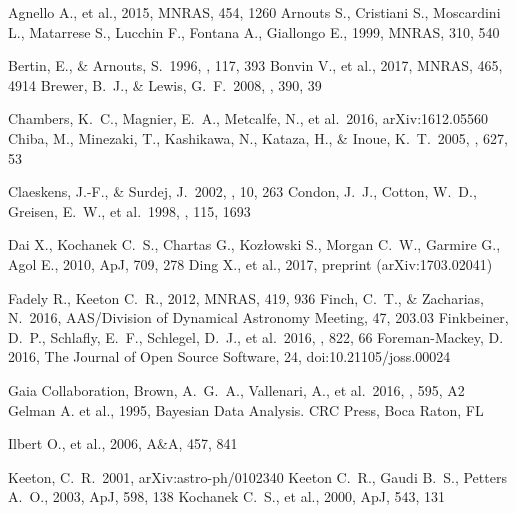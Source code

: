 \documentclass[manuscript]{aastex}
\begin{document}
\begin{thebibliography}{}

 Agnello A., et al., 2015, MNRAS, 454, 1260 
 Arnouts S., Cristiani S., Moscardini L., Matarrese S., Lucchin F., Fontana A., Giallongo E., 1999, MNRAS, 310, 540

 Bertin, E., \& Arnouts, S.\ 1996, \aaps, 117, 393 
 Bonvin V., et al., 2017, MNRAS, 465, 4914 
 Brewer, B.~J., \& Lewis, G.~F.\ 2008, \mnras, 390, 39 

 Chambers, K.~C., Magnier, E.~A., Metcalfe, N., et al.\ 2016, arXiv:1612.05560 
 Chiba, M., Minezaki, T., Kashikawa, N., Kataza, H., \& Inoue, K.~T.\ 2005, \apj, 627, 53 


 Claeskens, J.-F., \& Surdej, J.\ 2002, \aapr, 10, 263
 Condon, J.~J., Cotton, W.~D., Greisen, E.~W., et al.\ 1998, \aj, 115, 1693 

 Dai X., Kochanek C.~S., Chartas G., Koz{\l}owski S., Morgan C.~W., Garmire G., Agol E., 2010, ApJ, 709, 278 
 Ding X., et al., 2017, preprint (arXiv:1703.02041)

 Fadely R., Keeton C.~R., 2012, MNRAS, 419, 936 
 Finch, C.~T., \& Zacharias, N.\ 2016, AAS/Division of Dynamical Astronomy Meeting, 47, 203.03 
 Finkbeiner, D.~P., Schlafly, E.~F., Schlegel, D.~J., et al.\ 2016, \apj, 822, 66
 Foreman-Mackey, D. 2016, The Journal of Open Source Software, 24, doi:10.21105/joss.00024

 Gaia Collaboration, Brown, A.~G.~A., Vallenari, A., et al.\ 2016, \aap, 595, A2 
 Gelman A. et al., 1995, Bayesian Data Analysis. CRC Press, Boca Raton, FL

 Ilbert O., et al., 2006, A\&A, 457, 841 

 Keeton, C.~R.\ 2001, arXiv:astro-ph/0102340 
 Keeton C.~R., Gaudi B.~S., Petters A.~O., 2003, ApJ, 598, 138 
 Kochanek C.~S., et al., 2000, ApJ, 543, 131 


\end{thebibliography}
\end{document}
